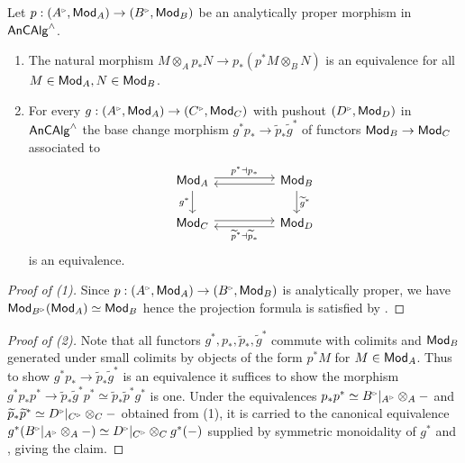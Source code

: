 \begin{proposition}\label{prop: analytically proper base change properties}
    Let $p:(A^{\tri},\Mod_{A})\to(B^{\tri},\Mod_{B})$ be an analytically proper morphism in $\mathsf{An}\mathsf{CAlg}^{\wedge}$.
    \begin{enumerate}
        \item The natural morphism $M\otimes_{A}p_{*}N\to p_{*}(p^{*}M\otimes_{B}N)$ is an equivalence for all $M\in\mathsf{Mod}_{A},N\in\mathsf{Mod}_{B}$. 
        \item For every $g:(A^{\tri},\Mod_{A})\to(C^{\tri},\Mod_{C})$ with pushout $(D^{\tri},\Mod_{D})$ in $\mathsf{An}\mathsf{CAlg}^{\wedge}$ the base change morphism $g^{*}p_{*}\to\widetilde{p}_{*}\widetilde{g}^{*}$ of functors $\mathsf{Mod}_{B}\to\mathsf{Mod}_{C}$ associated to
        $$%
        \begin{tikzcd}
            {\Mod_{A}} && {\Mod_{B}} \\
            {\Mod_{C}} && {\Mod_{D}}
            \arrow["{p^{*}\dashv p_{*}}", shift left, from=1-1, to=1-3]
            \arrow["{g^{*}}"', from=1-1, to=2-1]
            \arrow[shift left, from=1-3, to=1-1]
            \arrow["{\widetilde{g}^{*}}", from=1-3, to=2-3]
            \arrow[shift left, from=2-1, to=2-3]
            \arrow["{\widetilde{p}^{*}\dashv\widetilde{p}_{*}}", shift left, from=2-3, to=2-1]
        \end{tikzcd}$$
        is an equivalence. 
    \end{enumerate}
\end{proposition}
\begin{proof}[Proof of (1)]
    Since $p:(A^{\tri},\Mod_{A})\to(B^{\tri},\Mod_{B})$ is analytically proper, we have $\Mod_{B^{\tri}}(\Mod_{A})\simeq\Mod_{B}$ hence the projection formula is satisfied by \cite[Cor. 4.8.5.21]{HA}. 
\end{proof}
\begin{proof}[Proof of (2)]
    Note that all functors $g^{*},p_{*},\widetilde{p}_{*},\widetilde{g}^{*}$ commute with colimits and $\mathsf{Mod}_{B}$ generated under small colimits by objects of the form $p^{*}M$ for $M\in\mathsf{Mod}_{A}$. Thus to show $g^{*}p_{*}\to\widetilde{p}_{*}\widetilde{g}^{*}$ is an equivalence it suffices to show the morphism $g^{*}p_{*}p^{*}\to\widetilde{p}_{*}\widetilde{g}^{*}p^{*}\simeq\widetilde{p}_{*}\widetilde{p}^{*}g^{*}$ is one. Under the equivalences $p_{*}p^{*}\simeq B^{\tri}|_{A^{\tri}}\otimes_{A}-$ and $\widetilde{p}_{*}\widetilde{p}^{*}\simeq D^{\tri}|_{C^{\tri}}\otimes_{C}-$ obtained from (1), it is carried to the canonical equivalence $g^{*}(B^{\tri}|_{A^{\tri}}\otimes_{A}-)\simeq D^{\tri}|_{C^{\tri}}\otimes_{C}g^{*}(-)$ supplied by symmetric monoidality of $g^{*}$ and , giving the claim.
\end{proof}
